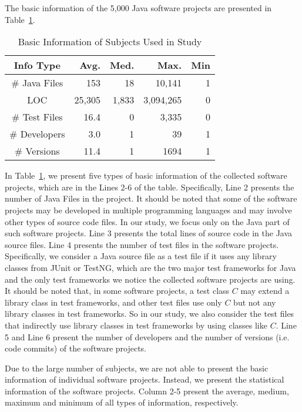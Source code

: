 The basic information of the 5,000 Java software projects are presented in Table~\ref{table:basic}.

\begin{table}
\caption{Basic Information of Subjects Used in Study}
\label{table:basic}
\centering
\begin{tabular}{|c|r|r|r|r|}
\hline
Info Type & Avg. & Med. & Max. & Min\\
\hline
\# Java Files &153&18&10,141&1\\
LOC  &25,305&1,833&3,094,265&0\\
\# Test Files  &16.4&0&3,335&0\\
\# Developers  &3.0&1&39&1\\
\# Versions  &11.4&1&1694&1\\
\hline
\end{tabular}
\end{table}

In Table~\ref{table:basic}, we present five types of basic information of the collected software projects, which are in the Lines 2-6 of the table. Specifically, Line 2 presents the number of Java Files in the project. It should be noted that some of the software projects may be developed in multiple programming languages and may involve other types of source code files. In our study, we focus only on the Java part of such software projects. Line 3 presents the total lines of source code in the Java source files. Line 4 presents the number of test files in the software projects. Specifically, we consider a Java source file as a test file if it uses any library classes from JUnit or TestNG, which are the two major test frameworks for Java and the only test frameworks we notice the collected software projects are using. It should be noted that, in some software projects, a test class $C$ may extend a library class in test frameworks, and other test files use only $C$ but not any library classes in test frameworks. So in our study, we also consider the test files that indirectly use library classes in test frameworks by using classes like $C$. Line 5 and Line 6 present the number of developers and the number of versions (i.e. code commits) of the software projects. 

Due to the large number of subjects, we are not able to present the basic information of individual software projects. Instead, we present the statistical information of the software projects. Column 2-5 present the average, medium, maximum and minimum of all types of information, respectively.  

